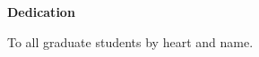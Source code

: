 \newpage
{}

\begin{center}
\textbf{Dedication}
\end{center}

\begin{center}
To all graduate students by heart and name.
\end{center}

